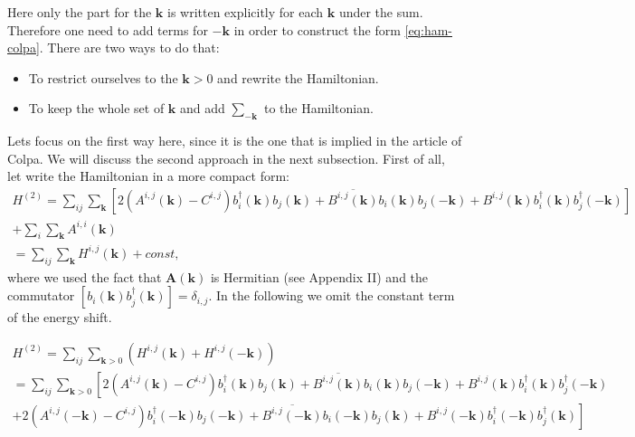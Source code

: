 \documentclass[a4paper,12pt]{article}
\begin{document}
            Here only the part for the $\boldsymbol{k}$ is written explicitly for each $\boldsymbol{k}$ under the sum. 
            Therefore one need to add terms for $-\boldsymbol{k}$ in order to construct the form \eqref{eq:ham-colpa}. 
            There are two ways to do that:

            \begin{itemize}
                \item To restrict ourselves to the $\boldsymbol{k} > 0$ and rewrite the Hamiltonian.

                \item To keep the whole set of $\boldsymbol{k}$ and add $\sum_{-\boldsymbol{k}}$ to the Hamiltonian.
            \end{itemize}

            Lets focus on the first way here, since it is the one that is implied in the article of Colpa. 
            We will discuss the second approach in the next subsection.
             First of all, let write the Hamiltonian in a more compact form:
            \begin{multline}
                H^{(2)} = \sum_{ij}\sum_{\boldsymbol{k}}\left[2(A^{i,j}(\boldsymbol{k}) - C^{i,j})b^{\dag}_{i}(\boldsymbol{k})b_{j}(\boldsymbol{k}) + 
                \overline{B^{i,j}(\boldsymbol{k})}b_{i}(\boldsymbol{k})b_{j}(-\boldsymbol{k}) +
                B^{i,j}(\boldsymbol{k})b^{\dag}_{i}(\boldsymbol{k})b^{\dag}_{j}(-\boldsymbol{k})\right] \\
                +\sum_i \sum_{\boldsymbol{k}} A^{i,i}(\boldsymbol{k}) \\
                = \sum_{ij}\sum_{\boldsymbol{k}} H^{i,j}(\boldsymbol{k}) 
                + const,
            \end{multline}
            where we used the fact that $\boldsymbol{A}(\boldsymbol{k})$ is Hermitian (see Appendix II) and the commutator $[b_{i}(\boldsymbol{k})b^{\dag}_{j}(\boldsymbol{k})] = \delta_{i,j}$. 
            In the following we omit the constant term of the energy shift. 

            \begin{multline}
                H^{(2)} = \sum_{ij}\sum_{\boldsymbol{k} > 0} \left(H^{i,j}(\boldsymbol{k}) + H^{i,j}(-\boldsymbol{k})\right) \\
                = \sum_{ij}\sum_{\boldsymbol{k} > 0}\left[2(A^{i,j}(\boldsymbol{k}) - C^{i,j})b^{\dag}_{i}(\boldsymbol{k})b_{j}(\boldsymbol{k}) + 
                \overline{B^{i,j}(\boldsymbol{k})}b_{i}(\boldsymbol{k})b_{j}(-\boldsymbol{k}) +
                B^{i,j}(\boldsymbol{k})b^{\dag}_{i}(\boldsymbol{k})b^{\dag}_{j}(-\boldsymbol{k})\right. \\
                +\left.2(A^{i,j}(-\boldsymbol{k}) - C^{i,j})b^{\dag}_{i}(-\boldsymbol{k})b_{j}(-\boldsymbol{k}) + 
                \overline{B^{i,j}(-\boldsymbol{k})}b_{i}(-\boldsymbol{k})b_{j}(\boldsymbol{k}) +
                B^{i,j}(-\boldsymbol{k})b^{\dag}_{i}(-\boldsymbol{k})b^{\dag}_{j}(\boldsymbol{k})\right]
            \end{multline}
\end{document}
